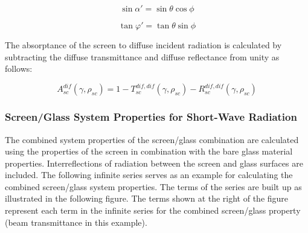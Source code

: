 \begin{equation}
\sin \alpha ' = \sin \theta \cos \phi
\end{equation}

\begin{equation}
\tan \varphi ' = \tan \theta \sin \phi
\end{equation}

The absorptance of the screen to diffuse incident radiation is calculated by subtracting the diffuse transmittance and diffuse reflectance from unity as follows:

\begin{equation}
A_{sc}^{dif}(\gamma ,{\rho_{sc}}) = 1 - T_{sc}^{dif,dif}(\gamma ,{\rho_{sc}}) - R_{sc}^{dif,dif}(\gamma ,{\rho_{sc}})
\end{equation}

\subsubsection{Screen/Glass System Properties for Short-Wave Radiation}\label{screenglass-system-properties-for-short-wave-radiation}

The combined system properties of the screen/glass combination are calculated using the properties of the screen in combination with the bare glass material properties. Interreflections of radiation between the screen and glass surfaces are included. The following infinite series serves as an example for calculating the combined screen/glass system properties. The terms of the series are built up as illustrated in the following figure. The terms shown at the right of the figure represent each term in the infinite series for the combined screen/glass property (beam transmittance in this example).

